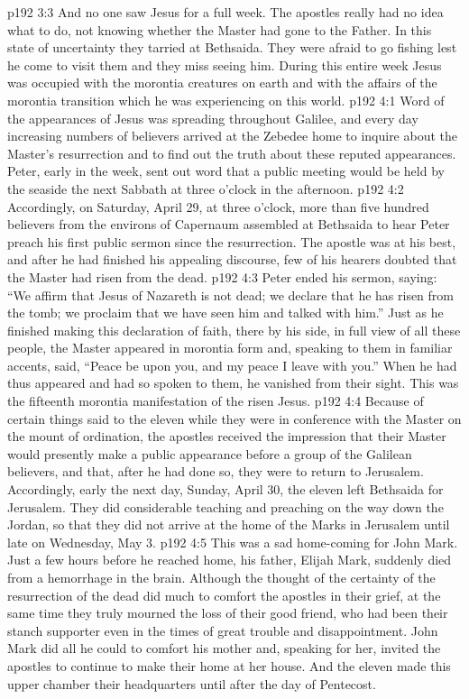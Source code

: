 \pc \vs p192 3:3 And no one saw Jesus for a full week. The apostles really had no idea what to do, not knowing whether the Master had gone to the Father. In this state of uncertainty they tarried at Bethsaida. They were afraid to go fishing lest he come to visit them and they miss seeing him. During this entire week Jesus was occupied with the morontia creatures on earth and with the affairs of the morontia transition which he was experiencing on this world.
\vs p192 4:1 Word of the appearances of Jesus was spreading throughout Galilee, and every day increasing numbers of believers arrived at the Zebedee home to inquire about the Master’s resurrection and to find out the truth about these reputed appearances. Peter, early in the week, sent out word that a public meeting would be held by the seaside the next Sabbath at three o’clock in the afternoon.
\vs p192 4:2 Accordingly, on Saturday, April 29, at three o’clock, more than five hundred believers from the environs of Capernaum assembled at Bethsaida to hear Peter preach his first public sermon since the resurrection. The apostle was at his best, and after he had finished his appealing discourse, few of his hearers doubted that the Master had risen from the dead.
\vs p192 4:3 Peter ended his sermon, saying: “We affirm that Jesus of Nazareth is not dead; we declare that he has risen from the tomb; we proclaim that we have seen him and talked with him.” Just as he finished making this declaration of faith, there by his side, in full view of all these people, the Master appeared in morontia form and, speaking to them in familiar accents, said, \textcolor{ubdarkred}{“Peace be upon you, and my peace I leave with you.”} When he had thus appeared and had so spoken to them, he vanished from their sight. This was the fifteenth morontia manifestation of the risen Jesus.
\pc \vs p192 4:4 Because of certain things said to the eleven while they were in conference with the Master on the mount of ordination, the apostles received the impression that their Master would presently make a public appearance before a group of the Galilean believers, and that, after he had done so, they were to return to Jerusalem. Accordingly, early the next day, Sunday, April 30, the eleven left Bethsaida for Jerusalem. They did considerable teaching and preaching on the way down the Jordan, so that they did not arrive at the home of the Marks in Jerusalem until late on Wednesday, May 3.
\pc \vs p192 4:5 This was a sad home\hyp{}coming for John Mark. Just a few hours before he reached home, his father, Elijah Mark, suddenly died from a hemorrhage in the brain. Although the thought of the certainty of the resurrection of the dead did much to comfort the apostles in their grief, at the same time they truly mourned the loss of their good friend, who had been their stanch supporter even in the times of great trouble and disappointment. John Mark did all he could to comfort his mother and, speaking for her, invited the apostles to continue to make their home at her house. And the eleven made this upper chamber their headquarters until after the day of Pentecost.
